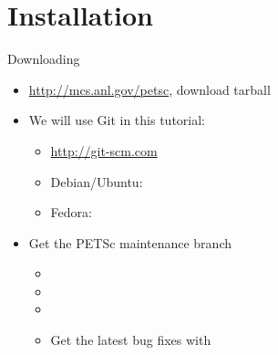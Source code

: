 \section{Installation}
\begin{frame}{Downloading}
\begin{itemize}
  \item \url{http://mcs.anl.gov/petsc}, download tarball
  \item We will use Git in this tutorial:
  \begin{itemize}
    \item \url{http://git-scm.com}
    \item Debian/Ubuntu: 
    \item Fedora: 
  \end{itemize}
  \item Get the PETSc maintenance branch
  \begin{itemize}\footnotesize
    \item {}
    \item {}
    \item {}
    \item Get the latest bug fixes with 
  \end{itemize}
\end{itemize}
\end{frame}

